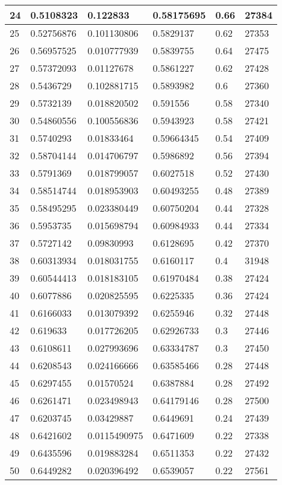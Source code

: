 \begin{longtable}{|l|l|l|l|l|l|}
24 & 0.5108323 & 0.122833 & 0.58175695 & 0.66 & 27384 \\ \hline 
25 & 0.52756876 & 0.101130806 & 0.5829137 & 0.62 & 27353 \\ \hline 
26 & 0.56957525 & 0.010777939 & 0.5839755 & 0.64 & 27475 \\ \hline 
27 & 0.57372093 & 0.01127678 & 0.5861227 & 0.62 & 27428 \\ \hline 
28 & 0.5436729 & 0.102881715 & 0.5893982 & 0.6 & 27360 \\ \hline 
29 & 0.5732139 & 0.018820502 & 0.591556 & 0.58 & 27340 \\ \hline 
30 & 0.54860556 & 0.100556836 & 0.5943923 & 0.58 & 27421 \\ \hline 
31 & 0.5740293 & 0.01833464 & 0.59664345 & 0.54 & 27409 \\ \hline 
32 & 0.58704144 & 0.014706797 & 0.5986892 & 0.56 & 27394 \\ \hline 
33 & 0.5791369 & 0.018799057 & 0.6027518 & 0.52 & 27430 \\ \hline 
34 & 0.58514744 & 0.018953903 & 0.60493255 & 0.48 & 27389 \\ \hline 
35 & 0.58495295 & 0.023380449 & 0.60750204 & 0.44 & 27328 \\ \hline 
36 & 0.5953735 & 0.015698794 & 0.60984933 & 0.44 & 27334 \\ \hline 
37 & 0.5727142 & 0.09830993 & 0.6128695 & 0.42 & 27370 \\ \hline 
38 & 0.60313934 & 0.018031755 & 0.6160117 & 0.4 & 31948 \\ \hline 
39 & 0.60544413 & 0.018183105 & 0.61970484 & 0.38 & 27424 \\ \hline 
40 & 0.6077886 & 0.020825595 & 0.6225335 & 0.36 & 27424 \\ \hline 
41 & 0.6166033 & 0.013079392 & 0.6255946 & 0.32 & 27448 \\ \hline 
42 & 0.619633 & 0.017726205 & 0.62926733 & 0.3 & 27446 \\ \hline 
43 & 0.6108611 & 0.027993696 & 0.63334787 & 0.3 & 27450 \\ \hline 
44 & 0.6208543 & 0.024166666 & 0.63585466 & 0.28 & 27448 \\ \hline 
45 & 0.6297455 & 0.01570524 & 0.6387884 & 0.28 & 27492 \\ \hline 
46 & 0.6261471 & 0.023498943 & 0.64179146 & 0.28 & 27500 \\ \hline 
47 & 0.6203745 & 0.03429887 & 0.6449691 & 0.24 & 27439 \\ \hline 
48 & 0.6421602 & 0.0115490975 & 0.6471609 & 0.22 & 27338 \\ \hline 
49 & 0.6435596 & 0.019883284 & 0.6511353 & 0.22 & 27432 \\ \hline 
50 & 0.6449282 & 0.020396492 & 0.6539057 & 0.22 & 27561 \\ \hline 
\end{longtable}